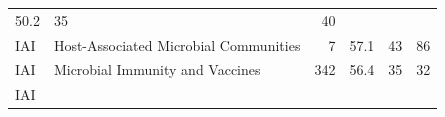 \documentclass[11pt,]{article}
\begin{document}
\begin{longtable}[]{@{}llrrrr@{}}
\begin{minipage}[t]{0.08\columnwidth}
50.2\strut
\end{minipage} & \begin{minipage}[t]{0.11\columnwidth}\raggedleft\strut
35\strut
\end{minipage} & \begin{minipage}[t]{0.11\columnwidth}\raggedleft\strut
40\strut
\end{minipage}\tabularnewline
\begin{minipage}[t]{0.06\columnwidth}\raggedright\strut
IAI\strut
\end{minipage} & \begin{minipage}[t]{0.43\columnwidth}\raggedright\strut
Host-Associated Microbial Communities\strut
\end{minipage} & \begin{minipage}[t]{0.04\columnwidth}\raggedleft\strut
7\strut
\end{minipage} & \begin{minipage}[t]{0.08\columnwidth}\raggedleft\strut
57.1\strut
\end{minipage} & \begin{minipage}[t]{0.11\columnwidth}\raggedleft\strut
43\strut
\end{minipage} & \begin{minipage}[t]{0.11\columnwidth}\raggedleft\strut
86\strut
\end{minipage}\tabularnewline
\begin{minipage}[t]{0.06\columnwidth}\raggedright\strut
IAI\strut
\end{minipage} & \begin{minipage}[t]{0.43\columnwidth}\raggedright\strut
Microbial Immunity and Vaccines\strut
\end{minipage} & \begin{minipage}[t]{0.04\columnwidth}\raggedleft\strut
342\strut
\end{minipage} & \begin{minipage}[t]{0.08\columnwidth}\raggedleft\strut
56.4\strut
\end{minipage} & \begin{minipage}[t]{0.11\columnwidth}\raggedleft\strut
35\strut
\end{minipage} & \begin{minipage}[t]{0.11\columnwidth}\raggedleft\strut
32\strut
\end{minipage}\tabularnewline
\begin{minipage}[t]{0.06\columnwidth}\raggedright\strut
IAI\strut
\end{minipage} & \begin{minipage}[t]{0.43\columnwidth}\raggedright\strut

\end{minipage}
\end{longtable}
\end{document}
